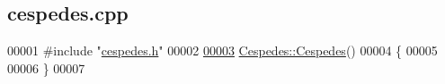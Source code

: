 \hypertarget{cespedes_8cpp_source}{}\subsection{cespedes.\+cpp}
\label{cespedes_8cpp_source}

\begin{DoxyCode}
00001 \textcolor{preprocessor}{#include "\hyperlink{cespedes_8h}{cespedes.h}"}
00002 
\hypertarget{cespedes_8cpp_source_l00003}{}\hyperlink{class_cespedes_a99ce54693c7ff065d8973167cee9caa7}{00003} \hyperlink{class_cespedes_a99ce54693c7ff065d8973167cee9caa7}{Cespedes::Cespedes}()
00004 \{
00005   
00006 \}
00007 
\end{DoxyCode}
